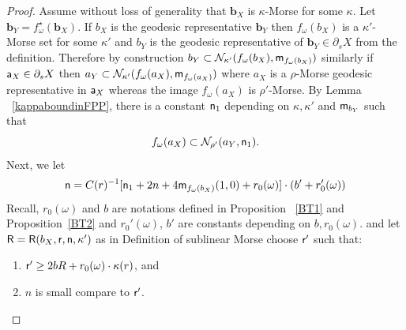 \documentclass[12 pt]{amsart}
\newcommand{\calN}{\mathcal{N}}
\newcommand{\bfa}{\textbf{a}}
\newcommand{\bfb}{\textbf{b}}
\theoremstyle{definition}
\theoremstyle{remark}
\newcommand{\sR}{{\sf R}}
\renewcommand{\bfa}{{\sf a}}
\newcommand{\mm}{{\sf m}}
\newcommand{\nn}{{\sf n}}
\newcommand{\rr}{{\sf r}}
\begin{document}
\begin{proof}
Assume without loss of generality that $\bfb_X$ is $\kappa$-Morse for some $\kappa$. Let $\bfb_Y = f_\omega^\star(\bfb_X)$. If $b_X$ is the geodesic representative $\bfb_Y$ then $f_\omega(b_X)$ is a $\kappa'$-Morse set for some $\kappa'$ and $b_Y$ is the geodesic representative of $\bfb_Y \in \partial_sX$ from the definition. Therefore by construction $b_Y \subset \calN_{\kappa'}(f_\omega(b_X),\mm_{f_\omega(b_X)})$  
similarly if $\bfa_X\in \partial_sX $ then $a_Y \subset \calN_{\kappa'}(f_\omega(a_X),\mm_{f_\omega(a_X)})$ where $a_X$ is a $\rho$-Morse geodesic representative in $\bfa_X$ whereas the image $f_\omega(a_X)$ is $\rho'$-Morse. By Lemma ~\ref{kappaboundinFPP}, there is a constant $\nn_1$ depending on $\kappa, \kappa'$ and $\mm_{b_Y}$ such that 
\[
f_\omega( a_X) \subset \calN_{\rho'}(a_Y, \nn_1). 
\]
Next, we let 
\[
\nn =  C(r)^{-1}[\nn_1 +2n+4\mm_{f_\omega(b_X)}(1,0)+r_0(\omega)] \cdot (b'+r_0'(\omega)) 
\]
Recall, $r_0(\omega)$ and $b$ are notations defined in Proposition ~\ref{BT1} and Proposition~\ref{BT2} and  $r_0'(\omega)$, $b'$ are constants depending on $b, r_0(\omega).$
and let $\sR = \sR(b_X, \rr, \nn, \kappa')$ as in Definition of sublinear Morse 
choose $\rr'$ such that:
\begin{enumerate}
\item $\rr' \geq 2bR + r_0(\omega) \cdot \kappa(r)$, and
\item $n$ is small  compare to $\rr'$.
\end{enumerate}
\begin{figure}

\begin{tikzpicture}[x=0.75pt,y=0.75pt,yscale=-1,xscale=1]


\end{tikzpicture}
\end{figure}
\end{proof}
\end{document}
